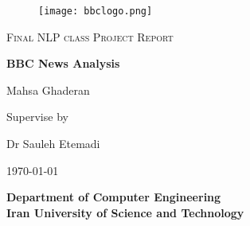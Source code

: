 \begin{titlepage}
    \begin{center}
        \vspace*{0cm}
        
        \begin{figure}[h]
        \begin{center}
        \texttt{[image: bbclogo.png]}
        \end{center}
        \end{figure}
        \vspace*{1cm}
        
        \LARGE
        \textsc{Final NLP class Project Report}
        \vspace{1cm}
                
        \Huge
        \textbf{BBC News Analysis}
        \vspace{1.5cm}
        
        \LARGE
	 	Mahsa Ghaderan
        \vspace{1.5cm}
        
        \large 
        Supervise by
        \vspace{.5cm}
        
        \Large 
        Dr Sauleh Etemadi
        \vspace{.2cm}
        

        
     
        \vfill
        {\small \monthyeardate\today}
        
        \vspace{1cm}       
        {\Large \textbf{Department of Computer Engineering\\Iran University of Science and Technology}}
            
        \vspace*{0cm}
        
    \end{center}
\end{titlepage}
